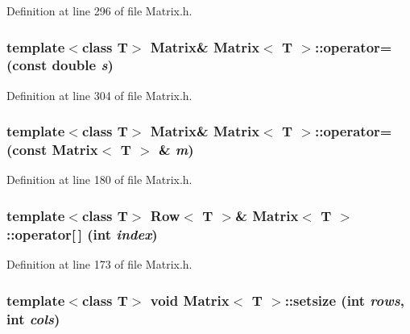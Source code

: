 Definition at line 296 of file Matrix.h.

\hypertarget{classMatrix_a9bea17f8319e2e2064fd85700e46d2fb}{
\subsubsection[{operator=}]{\setlength{\rightskip}{0pt plus 5cm}template$<$class T$>$ {\bf Matrix}\& {\bf Matrix}$<$ T $>$::operator= (const double {\em s})}}
\label{classMatrix_a9bea17f8319e2e2064fd85700e46d2fb}


Definition at line 304 of file Matrix.h.

\hypertarget{classMatrix_a94508f84ba0d62e81aa8d508aa43f1ec}{
\subsubsection[{operator=}]{\setlength{\rightskip}{0pt plus 5cm}template$<$class T$>$ {\bf Matrix}\& {\bf Matrix}$<$ T $>$::operator= (const {\bf Matrix}$<$ T $>$ \& {\em m})}}
\label{classMatrix_a94508f84ba0d62e81aa8d508aa43f1ec}


Definition at line 180 of file Matrix.h.

\hypertarget{classMatrix_a5af1a30e7a004b1cefe7b3f5398bcc77}{
\subsubsection[{operator[]}]{\setlength{\rightskip}{0pt plus 5cm}template$<$class T$>$ {\bf Row}$<$ T $>$\& {\bf Matrix}$<$ T $>$::operator\mbox{[}$\,$\mbox{]} (int {\em index})}}
\label{classMatrix_a5af1a30e7a004b1cefe7b3f5398bcc77}


Definition at line 173 of file Matrix.h.

\hypertarget{classMatrix_a8be203acf909fbb2050bf37470c88802}{
\subsubsection[{setsize}]{\setlength{\rightskip}{0pt plus 5cm}template$<$class T$>$ void {\bf Matrix}$<$ T $>$::setsize (int {\em rows}, \/  int {\em cols})}}
\label{classMatrix_a8be203acf909fbb2050bf37470c88802}


